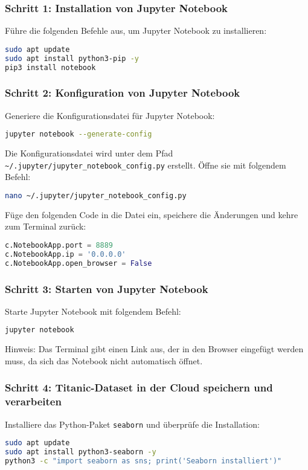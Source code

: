 \documentclass[a4paper,12pt]{article}
\begin{document}
\subsubsection{Schritt 1: Installation von Jupyter Notebook}
Führe die folgenden Befehle aus, um Jupyter Notebook zu installieren:
\begin{lstlisting}[language=bash]
sudo apt update
sudo apt install python3-pip -y
pip3 install notebook
\end{lstlisting}

\subsubsection{Schritt 2: Konfiguration von Jupyter Notebook}
Generiere die Konfigurationsdatei für Jupyter Notebook:
\begin{lstlisting}[language=bash]
jupyter notebook --generate-config
\end{lstlisting}

\noindent
Die Konfigurationsdatei wird unter dem Pfad \texttt{\textasciitilde/.jupyter/jupyter\_notebook\_config.py} erstellt. Öffne sie mit folgendem Befehl:
\begin{lstlisting}[language=bash]
nano ~/.jupyter/jupyter_notebook_config.py
\end{lstlisting}

\noindent
Füge den folgenden Code in die Datei ein, speichere die Änderungen und kehre zum Terminal zurück:
\begin{lstlisting}[language=Python]
c.NotebookApp.port = 8889
c.NotebookApp.ip = '0.0.0.0'
c.NotebookApp.open_browser = False
\end{lstlisting}

\subsubsection{Schritt 3: Starten von Jupyter Notebook}
Starte Jupyter Notebook mit folgendem Befehl:
\begin{lstlisting}[language=bash]
jupyter notebook
\end{lstlisting}

\noindent
Hinweis: Das Terminal gibt einen Link aus, der in den Browser eingefügt werden muss, da sich das Notebook nicht automatisch öffnet.

\subsubsection{Schritt 4: Titanic-Dataset in der Cloud speichern und verarbeiten}
Installiere das Python-Paket \texttt{seaborn} und überprüfe die Installation:
\begin{lstlisting}[language=bash]
sudo apt update
sudo apt install python3-seaborn -y
python3 -c "import seaborn as sns; print('Seaborn installiert')"
\end{lstlisting}
\end{document}
